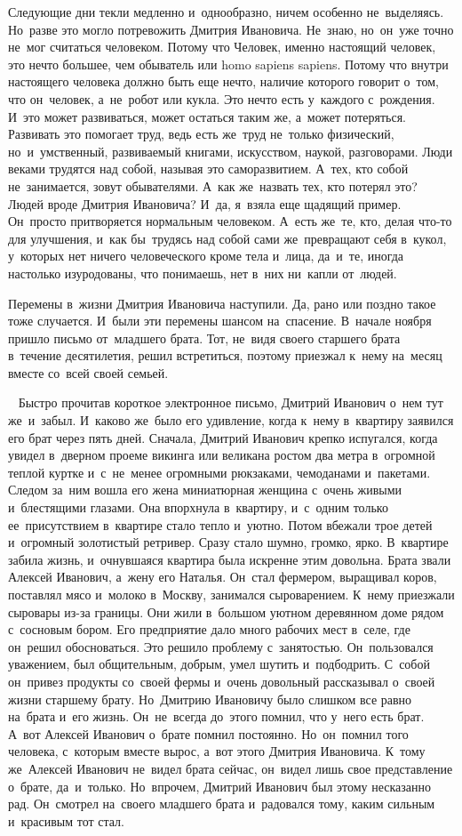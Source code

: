 Следующие дни текли медленно и~однообразно, ничем особенно не~выделяясь.
Но~разве это могло потревожить Дмитрия Ивановича.
Не~знаю, но~он~уже точно не~мог считаться человеком.
Потому что Человек, именно настоящий человек, это нечто большее, чем обыватель или homo sapiens sapiens.
Потому что внутри настоящего человека должно быть еще нечто, наличие которого говорит о~том, что он~человек, а~не~робот или кукла.
Это нечто есть у~каждого с~рождения.
И~это может развиваться, может остаться таким же, а~может потеряться.
Развивать это помогает труд, ведь есть же~труд не~только физический, но~и~умственный, развиваемый книгами, искусством, наукой, разговорами.
Люди веками трудятся над собой, называя это саморазвитием.
А~тех, кто собой не~занимается, зовут обывателями.
А~как же~назвать тех, кто потерял это? Людей вроде Дмитрия Ивановича? И~да, я~взяла еще щадящий пример.
Он~просто притворяется нормальным человеком.
А~есть же~те, кто, делая что-то для улучшения, и~как бы~трудясь над собой сами же~превращают себя в~кукол, у~которых нет ничего человеческого кроме тела и~лица, да~и~те, иногда настолько изуродованы, что понимаешь, нет в~них ни~капли от~людей.
 
Перемены в~жизни Дмитрия Ивановича наступили.
Да, рано или поздно такое тоже случается.
И~были эти перемены шансом на~спасение.
В~начале ноября пришло письмо от~младшего брата.
Тот, не~видя своего старшего брата в~течение десятилетия, решил встретиться, поэтому приезжал к~нему на~месяц вместе со~всей своей семьей.

~
Быстро прочитав короткое электронное письмо, Дмитрий Иванович о~нем тут же~и~забыл.
И~каково же~было его удивление, когда к~нему в~квартиру заявился его брат через пять дней.
Сначала, Дмитрий Иванович крепко испугался, когда увидел в~дверном проеме викинга или великана ростом два метра в~огромной теплой куртке и~с~не~менее огромными рюкзаками, чемоданами и~пакетами.
Следом за~ним вошла его жена миниатюрная женщина с~очень живыми и~блестящими глазами.
Она впорхнула в~квартиру, и~с~одним только ее~присутствием в~квартире стало тепло и~уютно.
Потом вбежали трое детей и~огромный золотистый ретривер.
Сразу стало шумно, громко, ярко.
В~квартире забила жизнь, и~очнувшаяся квартира была искренне этим довольна.
Брата звали Алексей Иванович, а~жену его Наталья.
Он~стал фермером, выращивал коров, поставлял мясо и~молоко в~Москву, занимался сыроварением.
К~нему приезжали сыровары из-за границы.
Они жили в~большом уютном деревянном доме рядом с~сосновым бором.
Его предприятие дало много рабочих мест в~селе, где он~решил обосноваться.
Это решило проблему с~занятостью.
Он~пользовался уважением, был общительным, добрым, умел шутить и~подбодрить.
С~собой он~привез продукты со~своей фермы и~очень довольный рассказывал о~своей жизни старшему брату.
Но~Дмитрию Ивановичу было слишком все равно на~брата и~его жизнь.
Он~не~всегда до~этого помнил, что у~него есть брат.
А~вот Алексей Иванович о~брате помнил постоянно.
Но~он~помнил того человека, с~которым вместе вырос, а~вот этого Дмитрия Ивановича.
К~тому же~Алексей Иванович не~видел брата сейчас, он~видел лишь свое представление о~брате, да~и~только.
Но~впрочем, Дмитрий Иванович был этому несказанно рад.
Он~смотрел на~своего младшего брата и~радовался тому, каким сильным и~красивым тот стал.
 
